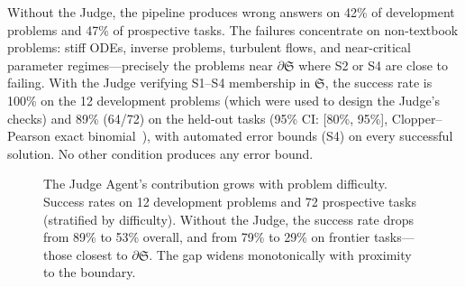 \documentclass[11pt,a4paper]{article}
\newcommand{\Sclass}{\mathfrak{S}}
\begin{document}
Without the Judge, the pipeline produces wrong answers on 42\% of development problems and 47\% of prospective tasks. The failures concentrate on non-textbook problems: stiff ODEs, inverse problems, turbulent flows, and near-critical parameter regimes---precisely the problems near $\partial \Sclass$ where S2 or S4 are close to failing. With the Judge verifying S1--S4 membership in $\Sclass$, the success rate is 100\% on the 12 development problems (which were used to design the Judge's checks) and 89\% (64/72) on the held-out tasks (95\% CI: [80\%, 95\%], Clopper--Pearson exact binomial~\cite{clopper1934}), with automated error bounds (S4) on every successful solution. No other condition produces any error bound.


\begin{figure}[htbp]
\centering
{}
\caption{The Judge Agent's contribution grows with problem difficulty. Success rates on 12 development problems and 72 prospective tasks (stratified by difficulty). Without the Judge, the success rate drops from 89\% to 53\% overall, and from 79\% to 29\% on frontier tasks---those closest to $\partial \Sclass$. The gap widens monotonically with proximity to the boundary.}
\label{fig:comparison}
\end{figure}
\end{document}
